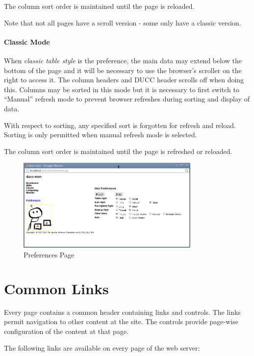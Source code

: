     The column sort order is maintained until the page is reloaded.

	Note that not all pages have a scroll version - some only have a classic version.
	
    \paragraph{Classic Mode}  When {\em classic table style} is the preference, the
    main data may extend below the bottom of the page and it will be necessary to use the browser's scroller on the right
    to access it.  The column headers and DUCC header scrolls off when doing this.  Columns
    may be sorted in this mode but it is necessary to first switch to ``Manual'' refresh mode to
    prevent browser refreshes during sorting and display of data. 
    
    With respect to sorting, any specified sort is forgotten for refresh
    and reload.  Sorting is only permitted when manual refresh mode is
    selected.
    
    The column sort order is maintained until the page is refreshed or reloaded.

\begin{figure}[ht!]
\centering
\includegraphics[width=90mm]{images/ducc-webserver/Preferences.png}
\caption{Preferences Page}
\end{figure}

\ifpdf
\else
{}
\fi
    \section{Common Links}

        Every page contains a common header containing links and controls. The links permit navigation
        to other content at the site. The controls provide page-wise configuration of the content at
        that page.

        The following links are available on every page of the web server: 

